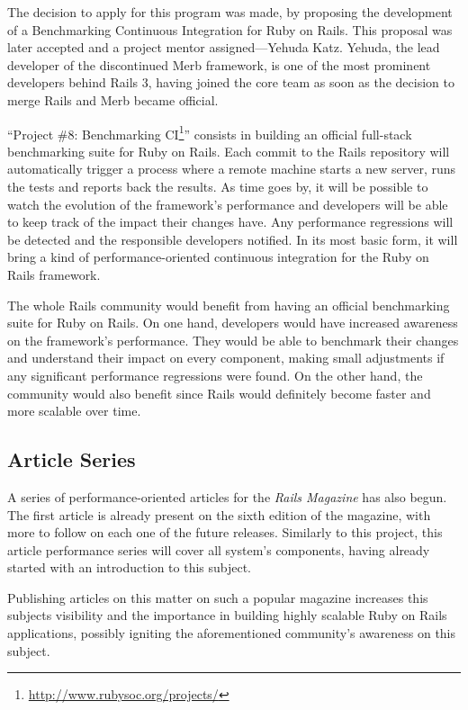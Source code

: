 The decision to apply for this program was made, by proposing the development of a Benchmarking Continuous Integration for Ruby on Rails. This proposal was later accepted and a project mentor assigned---Yehuda Katz. Yehuda, the lead developer of the discontinued Merb framework, is one of the most prominent developers behind Rails 3, having joined the core team as soon as the decision to merge Rails and Merb became official.

``Project \#8: Benchmarking CI\footnote{\url{http://www.rubysoc.org/projects/}}'' consists in building an official full-stack benchmarking suite for Ruby on Rails. Each commit to the Rails repository will automatically trigger a process where a remote machine starts a new server, runs the tests and reports back the results. As time goes by, it will be possible to watch the evolution of the framework's performance and developers will be able to keep track of the impact their changes have. Any performance regressions will be detected and the responsible developers notified. In its most basic form, it will bring a kind of performance-oriented continuous integration for the Ruby on Rails framework.

The whole Rails community would benefit from having an official benchmarking suite for Ruby on Rails. On one hand, developers would have increased awareness on the framework's performance. They would be able to benchmark their changes and understand their impact on every component, making small adjustments if any significant performance regressions were found. On the other hand, the community would also benefit since Rails would definitely become faster and more scalable over time.

\subsection{Article Series}

A series of performance-oriented articles for the \textit{Rails Magazine} has also begun. The first article is already present on the sixth edition of the magazine, with more to follow on each one of the future releases. Similarly to this project, this article performance series will cover all system's components, having already started with an introduction to this subject.

Publishing articles on this matter on such a popular magazine increases this subjects visibility and the importance in building highly scalable Ruby on Rails applications, possibly igniting the aforementioned community's awareness on this subject.
